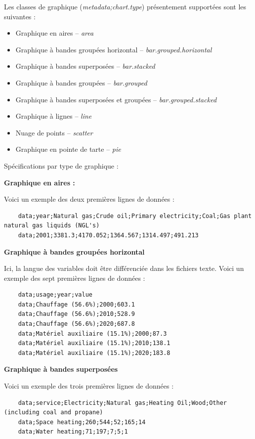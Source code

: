 \documentclass[11pt]{article}
\begin{document}
Les classes de graphique (\textit{metadata;chart.type}) présentement supportées sont les suivantes :
\begin{itemize}
    \item Graphique en aires -- \textit{area}
    \item Graphique à bandes groupées horizontal -- \textit{bar.grouped.horizontal}
    \item Graphique à bandes superposées -- \textit{bar.stacked}
    \item Graphique à bandes groupées -- \textit{bar.grouped}
    \item Graphique à bandes superposées et groupées -- \textit{bar.grouped.stacked}
    \item Graphique à lignes -- \textit{line}
    \item Nuage de points -- \textit{scatter}
    \item Graphique en pointe de tarte -- \textit{pie}
\end{itemize}

Spécifications par type de graphique :

\textbf{Graphique en aires :}

Voici un exemple des deux premières lignes de données :
\begin{lstlisting}
    data;year;Natural gas;Crude oil;Primary electricity;Coal;Gas plant natural gas liquids (NGL's)
    data;2001;3381.3;4170.052;1364.567;1314.497;491.213
\end{lstlisting}

\textbf{Graphique à bandes groupées horizontal}

Ici, la langue des variables doit être différenciée dans les fichiers texte. Voici un exemple des sept premières lignes de données :
\begin{lstlisting}
    data;usage;year;value
    data;Chauffage (56.6%);2000;603.1
    data;Chauffage (56.6%);2010;528.9
    data;Chauffage (56.6%);2020;687.8
    data;Matériel auxiliaire (15.1%);2000;87.3
    data;Matériel auxiliaire (15.1%);2010;138.1
    data;Matériel auxiliaire (15.1%);2020;183.8
\end{lstlisting}

\textbf{Graphique à bandes superposées}

Voici un exemple des trois premières lignes de données :
\begin{lstlisting}
    data;service;Electricity;Natural gas;Heating Oil;Wood;Other (including coal and propane)
    data;Space heating;260;544;52;165;14
    data;Water heating;71;197;7;5;1
\end{lstlisting}
\end{document}

